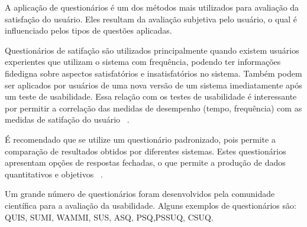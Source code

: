 	A aplicação de questionários é um dos métodos mais utilizados para avaliação da satisfação do usuário. Eles resultam da avaliação subjetiva pelo usuário, o qual é influenciado pelos tipos de questões aplicadas.
	
	Questionários de satifação são utilizados principalmente quando existem usuários experientes que utilizam o sistema com frequência, podendo ter informações fidedigna sobre aspectos satisfatórios e insatisfatórios no sistema. Também podem ser aplicados por usuários de uma nova versão de um sistema imediatamente após um teste de usabilidade. Essa relação com os testes de usabilidade é interessante por permitir a correlação das medidas de desempenho (tempo, frequência) com as medidas de satifação do usuário ~\cite{cybis2010}.

	É recomendado que se utilize um questionário padronizado, pois permite a comparação de resultados obtidos por diferentes sistemas. Estes questionários apresentam opções de respostas fechadas, o que permite a produção de dados quantitativos e objetivos ~\cite{cybis2010}.

	Um grande número de questionários foram desenvolvidos pela comunidade científica para a avaliação da usabilidade.  Alguns exemplos de questionários são: QUIS, SUMI,  WAMMI, SUS, ASQ, PSQ,PSSUQ, CSUQ. 

